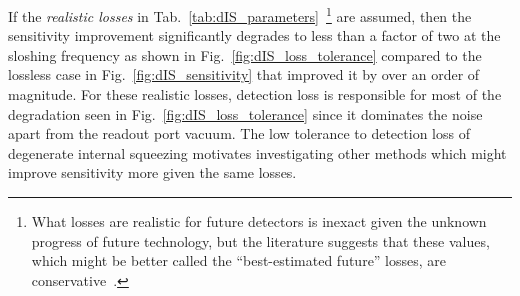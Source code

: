 If the \emph{realistic losses} in Tab.~\ref{tab:dIS_parameters}~\footnote{What losses are realistic for future detectors is inexact given the unknown progress of future technology, but the literature suggests that these values, which might be better called the ``best-estimated future'' losses, are conservative~\cite{zhangBroadbandSignalRecycling2021,flaminio2010study}.} are assumed, then the sensitivity improvement significantly degrades to less than a factor of two at the sloshing frequency as shown in Fig.~\ref{fig:dIS_loss_tolerance} compared to the lossless case in Fig.~\ref{fig:dIS_sensitivity} that improved it by over an order of magnitude. For these realistic losses, detection loss is responsible for most of the degradation seen in Fig.~\ref{fig:dIS_loss_tolerance} since it dominates the noise apart from the readout port vacuum. %
The low tolerance to detection loss of degenerate internal squeezing motivates investigating other methods which might improve sensitivity more given the same losses. 





